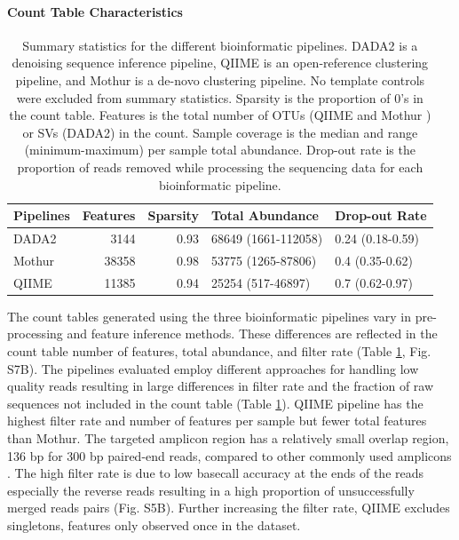 \documentclass{bmcart}
\begin{document}
\paragraph{Count Table Characteristics}
\begin{table}
\caption{\label{tab:pipeQA}Summary statistics for the different bioinformatic pipelines.
DADA2 is a denoising sequence inference pipeline, QIIME is an open-reference clustering
pipeline, and Mothur  is a de-novo clustering pipeline. No template controls were excluded
from summary statistics. Sparsity is the proportion of 0's in the count table. Features
is the total number of OTUs (QIIME and Mothur ) or SVs (DADA2) in the count. Sample
coverage is the median and range (minimum-maximum) per sample total abundance.
Drop-out rate is the proportion of reads removed while processing the sequencing data for each bioinformatic pipeline.}
\centering
\begin{tabular}[t]{lrrll}
\toprule
Pipelines & Features & Sparsity & Total Abundance & Drop-out Rate\\
\midrule
DADA2 & 3144 & 0.93 & 68649 (1661-112058) & 0.24 (0.18-0.59)\\
Mothur & 38358 & 0.98 & 53775 (1265-87806) & 0.4 (0.35-0.62)\\
QIIME & 11385 & 0.94 & 25254 (517-46897) & 0.7 (0.62-0.97)\\
\bottomrule
\end{tabular}
\end{table}

The count tables generated using the three bioinformatic pipelines vary in
pre-processing and feature inference methods. 
These differences are reflected in the count table number of features, total abundance,
and filter rate (Table \ref{tab:pipeQA}, Fig. S7B). The
pipelines evaluated employ different approaches for handling low quality
reads resulting in large differences in filter rate and the fraction
of raw sequences not included in the count table (Table
\ref{tab:pipeQA}). QIIME pipeline has the highest filter rate and
number of features per sample but fewer total features than Mothur. The
targeted amplicon region has a relatively small overlap region, 136 bp
for 300 bp paired-end reads, compared to other commonly used amplicons
\cite{kozich2013development, Walters2016-lf}. The high filter rate is
due to low basecall accuracy at the ends of the reads especially the
reverse reads resulting in a high proportion of unsuccessfully merged
reads pairs (Fig. S5B). Further increasing the
filter rate, QIIME excludes singletons, features only observed once in
the dataset.
\end{document}
